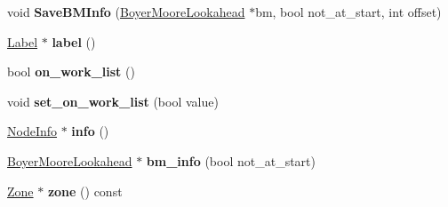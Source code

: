 \begin{DoxyCompactItemize}
\item 
void {\bfseries Save\+B\+M\+Info} (\hyperlink{classv8_1_1internal_1_1_boyer_moore_lookahead}{Boyer\+Moore\+Lookahead} $\ast$bm, bool not\+\_\+at\+\_\+start, int offset)\hypertarget{classv8_1_1internal_1_1_reg_exp_node_a6267579804303b6f30263d6470949ffe}{}\label{classv8_1_1internal_1_1_reg_exp_node_a6267579804303b6f30263d6470949ffe}

\item 
\hyperlink{classv8_1_1internal_1_1_label}{Label} $\ast$ {\bfseries label} ()\hypertarget{classv8_1_1internal_1_1_reg_exp_node_a1a0b5a61d350613e23c5014f80e79d3e}{}\label{classv8_1_1internal_1_1_reg_exp_node_a1a0b5a61d350613e23c5014f80e79d3e}

\item 
bool {\bfseries on\+\_\+work\+\_\+list} ()\hypertarget{classv8_1_1internal_1_1_reg_exp_node_aa140eaf712345d61115c6cfbc8042cc9}{}\label{classv8_1_1internal_1_1_reg_exp_node_aa140eaf712345d61115c6cfbc8042cc9}

\item 
void {\bfseries set\+\_\+on\+\_\+work\+\_\+list} (bool value)\hypertarget{classv8_1_1internal_1_1_reg_exp_node_af06878e6453358c2cec014fd3e7e97bd}{}\label{classv8_1_1internal_1_1_reg_exp_node_af06878e6453358c2cec014fd3e7e97bd}

\item 
\hyperlink{structv8_1_1internal_1_1_node_info}{Node\+Info} $\ast$ {\bfseries info} ()\hypertarget{classv8_1_1internal_1_1_reg_exp_node_a9a3f9318b3322877937dbd62b479531d}{}\label{classv8_1_1internal_1_1_reg_exp_node_a9a3f9318b3322877937dbd62b479531d}

\item 
\hyperlink{classv8_1_1internal_1_1_boyer_moore_lookahead}{Boyer\+Moore\+Lookahead} $\ast$ {\bfseries bm\+\_\+info} (bool not\+\_\+at\+\_\+start)\hypertarget{classv8_1_1internal_1_1_reg_exp_node_a11d15a06b5e058ace41d292bdb261c9a}{}\label{classv8_1_1internal_1_1_reg_exp_node_a11d15a06b5e058ace41d292bdb261c9a}

\item 
\hyperlink{classv8_1_1internal_1_1_zone}{Zone} $\ast$ {\bfseries zone} () const \hypertarget{classv8_1_1internal_1_1_reg_exp_node_aa35e3ffbc83c944ea9bf6360ec8579ab}{}\label{classv8_1_1internal_1_1_reg_exp_node_aa35e3ffbc83c944ea9bf6360ec8579ab}

\end{DoxyCompactItemize}
